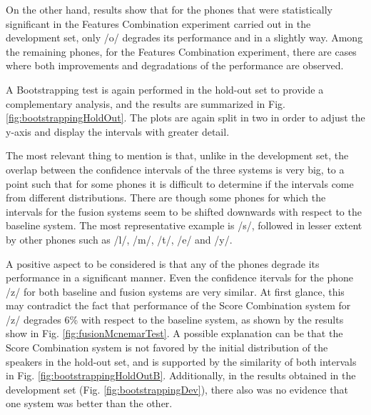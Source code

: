 On the other hand, results show that
for the phones that were statistically significant in the
Features Combination experiment carried out in the development set, only /o/ degrades
its performance and in a slightly way.
Among the remaining phones, for the Features Combination experiment,
there are cases where both improvements
and degradations of the performance are observed.

A Bootstrapping test is again performed in the hold-out set to provide a complementary analysis,
and the results are summarized in Fig. \ref{fig:bootstrappingHoldOut}.
The plots are again split in two in order to adjust the y-axis and display the intervals
with greater detail.

The most relevant thing to mention is that, unlike in the development set, the overlap
between the confidence intervals of the three systems is very big, to a point such that
for some phones it is difficult to determine if the intervals come from different
distributions. There are though some phones for which the intervals
for the fusion systems seem to be
shifted downwards with respect to the baseline system. The most representative example
is /s/, followed in lesser extent by other phones such as /l/, /m/, /t/, /e/ and /y/.

A positive aspect to be considered is that any of the phones degrade its performance in a
significant manner. Even the confidence itervals for the phone /z/ for both baseline and
fusion systems are very similar. At first glance, this may contradict the fact that
performance of the Score Combination system for /z/ degrades 6\% with respect to the baseline
system, as shown by the results show in Fig. \ref{fig:fusionMcnemarTest}.
A possible explanation can be that the Score Combination system is not favored by
the initial distribution of the speakers in the hold-out set, and is supported by
the similarity of both intervals in Fig. \ref{fig:bootstrappingHoldOutB}.
Additionally, in the results obtained in the development set (Fig. \ref{fig:bootstrappingDev}),
there also was no evidence that one system was better than the other.

